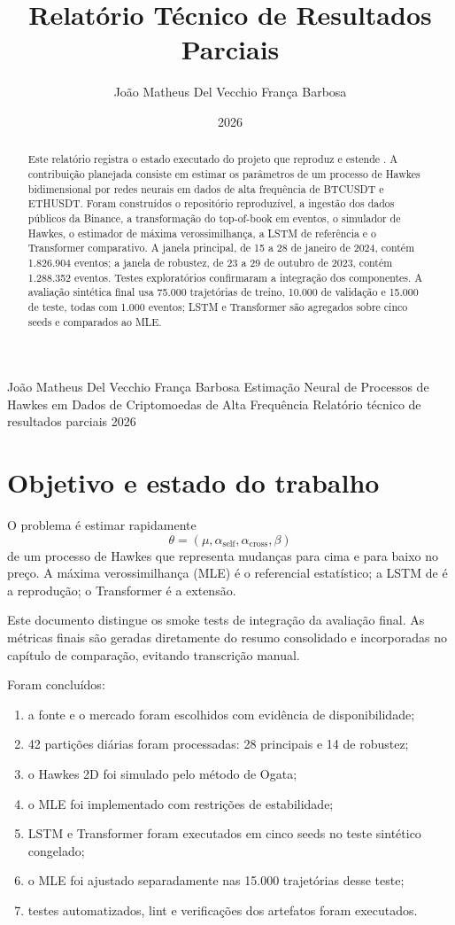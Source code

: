 \documentclass[12pt,a4paper]{report}
\title{Relatório Técnico de Resultados Parciais}
\author{João Matheus Del Vecchio França Barbosa}
\date{2026}
\begin{document}
\tgtitlepage
  {João Matheus Del Vecchio França Barbosa}
  {Estimação Neural de Processos de Hawkes em Dados de Criptomoedas de Alta Frequência}
  {Relatório técnico de resultados parciais}
  {2026}

\begin{abstract}
Este relatório registra o estado executado do projeto que reproduz e estende
\citet{lee2023}. A contribuição planejada consiste em estimar os parâmetros de um
processo de Hawkes bidimensional por redes neurais em dados de alta frequência de
BTCUSDT e ETHUSDT. Foram construídos o repositório reproduzível, a ingestão dos dados
públicos da Binance, a transformação do top-of-book em eventos, o simulador de Hawkes,
o estimador de máxima verossimilhança, a LSTM de referência e o Transformer comparativo.
A janela principal, de 15 a 28 de janeiro de 2024, contém 1.826.904 eventos; a janela
de robustez, de 23 a 29 de outubro de 2023, contém 1.288.352 eventos. Testes
exploratórios confirmaram a integração dos componentes. A avaliação sintética final
usa 75.000 trajetórias de treino, 10.000 de validação e 15.000 de teste, todas com
1.000 eventos; LSTM e Transformer são agregados sobre cinco seeds e comparados ao MLE.
\end{abstract}

\tableofcontents
\clearpage
{}

\chapter{Objetivo e estado do trabalho}

O problema é estimar rapidamente
\[
  \theta=(\mu,\alpha_{\mathrm{self}},\alpha_{\mathrm{cross}},\beta)
\]
de um processo de Hawkes que representa mudanças para cima e para baixo no preço.
A máxima verossimilhança (MLE) é o referencial estatístico; a LSTM de \citet{lee2023}
é a reprodução; o Transformer é a extensão.

\begin{statusbox}
Este documento distingue os smoke tests de integração da avaliação final. As métricas
finais são geradas diretamente do resumo consolidado e incorporadas no capítulo de
comparação, evitando transcrição manual.
\end{statusbox}

Foram concluídos:
\begin{enumerate}
  \item a fonte e o mercado foram escolhidos com evidência de disponibilidade;
  \item 42 partições diárias foram processadas: 28 principais e 14 de robustez;
  \item o Hawkes 2D foi simulado pelo método de Ogata;
  \item o MLE foi implementado com restrições de estabilidade;
  \item LSTM e Transformer foram executados em cinco seeds no teste sintético congelado;
  \item o MLE foi ajustado separadamente nas 15.000 trajetórias desse teste;
  \item testes automatizados, lint e verificações dos artefatos foram executados.
\end{enumerate}
\end{document}
